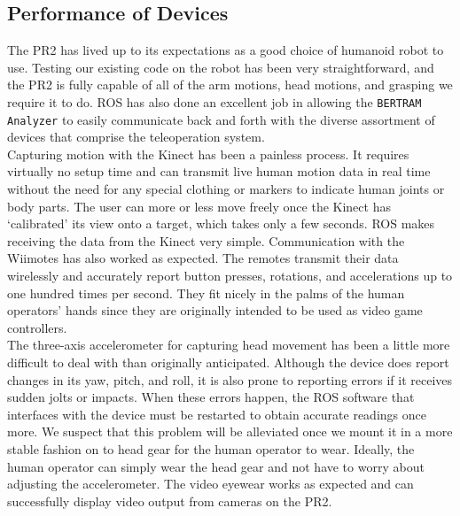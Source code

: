 \documentclass{sig-alternate}
\begin{document}
\subsection{Performance of Devices}
The PR2 has lived up to its expectations as a good choice of humanoid robot to 
use. Testing our existing code on the robot has been very straightforward, and 
the PR2 is fully capable of all of the arm motions, head motions, and grasping
we require it to do. ROS has also done an excellent job in allowing the 
{\tt BERTRAM Analyzer} to easily communicate back and forth with the diverse 
assortment of devices that comprise the teleoperation system.\\
\indent Capturing motion with the Kinect has been a painless process. It requires virtually no setup time and can transmit live human motion data in real time without the need for any special clothing or markers to indicate human joints or body parts. The user can more or less move freely once the Kinect has `calibrated' its view onto a target, which takes only a few seconds. ROS makes receiving the data from the Kinect very simple. Communication with the Wiimotes has also worked as expected. The remotes transmit their data wirelessly and accurately report button presses, rotations, and accelerations up to one hundred times per second. They fit nicely in the palms of the human operators' hands since they are originally intended to be used as video game controllers.\\
\indent The three-axis accelerometer for capturing head movement has been a little more difficult to deal with than originally anticipated. Although the device does report changes in its yaw, pitch, and roll, it is also prone to reporting errors if it receives sudden jolts or impacts. When these errors happen, the ROS software that interfaces with the device must be restarted to obtain accurate readings once more. We suspect that this problem will be alleviated once we mount it in a more stable fashion on to head gear for the human operator to wear. Ideally, the human operator can simply wear the head gear and not have to worry about adjusting the accelerometer. The video eyewear works as expected and can successfully display video output from cameras on the PR2.\\
\end{document}
